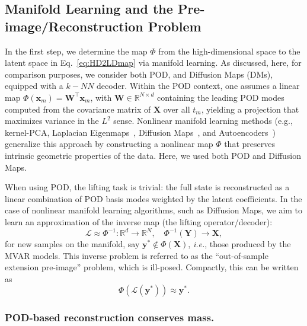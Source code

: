 \documentclass{article}
\begin{document}
\subsection{Manifold Learning and the Pre-image/Reconstruction Problem}
\label{subsec:pca}
In the first step, we determine the map $\varPhi$ from the high-dimensional space to the latent space in Eq.~\eqref{eq:HD2LDmap} via manifold learning. As discussed, here, for comparison purposes, we consider both POD, and Diffusion Maps (DMs), equipped with a $k-NN$ decoder. Within the POD context, one assumes a linear map $\varPhi(\boldsymbol{x}_m) = \mathbf{W}^\top\boldsymbol{x}_m$, with $\mathbf{W} \in \mathbb{R}^{N\times d}$ containing the leading POD modes computed from the covariance matrix of $\mathbf{X}$ over all $t_m$, yielding a projection that maximizes variance in the $L^2$ sense. Nonlinear manifold learning methods (e.g., kernel-PCA, Laplacian Eigenmaps~\cite{belkin2003laplacian,belkin2008towards}, Diffusion Maps~\cite{coifman2005geometric,coifman2006geometric,nadler2006diffusion,coifman2008diffusion,evangelou2022double,evangelou2022parameter}, and Autoencoders~\cite{vlachas2022multiscale,romor2023non}) generalize this approach by constructing a nonlinear map $\varPhi$ that preserves intrinsic geometric properties of the data. Here, we used both POD and Diffusion Maps. 

When using POD, the lifting task is trivial: the full state is reconstructed as a linear combination of POD basis modes weighted by the latent coefficients. In the case of nonlinear manifold learning algorithms, such as Diffusion Maps, we aim to learn an approximation of the inverse map (the lifting operator/decoder):
\begin{equation}
    \mathcal{L}
    \approx \varPhi^{-1}:\mathbb{R}^d\longrightarrow \mathbb{R}^N, \quad \varPhi^{-1}(\mathbf{Y}) \rightarrow \mathbf{X},
\end{equation}
for new samples on the manifold, say $\boldsymbol{y}^* \notin \varPhi(\mathbf{X})$, \textit{i.e.}, those produced by the MVAR models. This inverse problem is referred to as the ``out-of-sample extension pre-image'' problem, which is ill-posed. Compactly, this can be written as
\begin{equation}
\varPhi(\mathcal{L}(\mathbf{y}^*)) \approx \mathbf{y}^*.
\label{liftOP}
\end{equation}

\subsubsection{POD-based reconstruction conserves mass.}
\label{subsubsec:POD}
\end{document}

